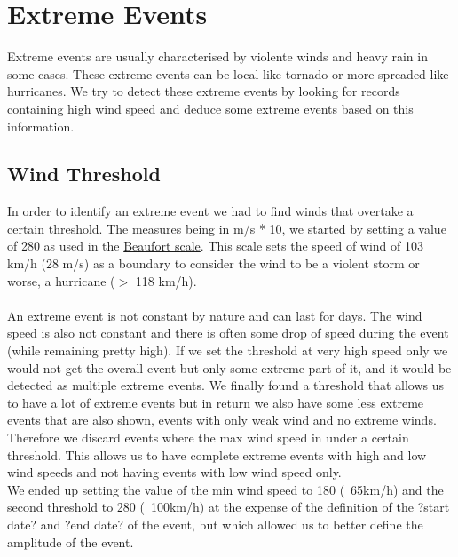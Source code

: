 \documentclass[12pt]{article}
\begin{document}
\section{Extreme Events}
\noindent
Extreme events are usually characterised by violente winds and heavy rain in some cases. These extreme events can be local like tornado or more spreaded like hurricanes. We try to detect these extreme events by looking for records containing high wind speed and deduce some extreme events based on this  information.

\subsection{Wind Threshold}
In order to identify an extreme event we had to find winds that overtake a certain threshold. The measures being in m/s * 10, we started by setting a value of 280 as used in the \href{http://en.wikipedia.org/wiki/Beaufort_scale}{Beaufort scale}. This scale sets the speed of wind of 103 km/h (28 m/s) as a boundary to consider the wind to be a violent storm or worse, a hurricane ($>$ 118 km/h).\\
\\
An extreme event is not constant by nature and can last for days. The wind speed is also not constant and there is often some drop of speed during the event (while remaining pretty high). If we set the threshold at very high speed only we would not get the overall event but only some extreme part of it, and it would be detected as multiple extreme events. We finally found a threshold that allows us to have a lot of extreme events but in return we also have some less extreme events that are also shown, events with only weak wind and no extreme winds. Therefore we discard events where the max wind speed in under a certain threshold. This allows us to have complete extreme events with high and low wind speeds and not having events with low wind speed only.\\
We ended up setting the value of the min wind speed to 180 (~65km/h) and the second threshold to 280 (~100km/h) at the expense of the definition of the ?start date? and ?end date? of the event, but which allowed us to better define the amplitude of the event.

\end{document}
